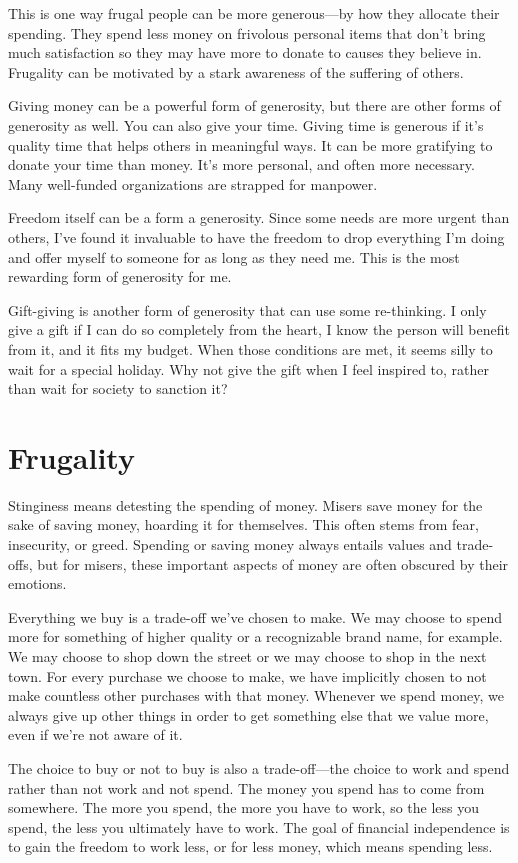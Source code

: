 This is one way frugal people can be more generous---by how they allocate their spending. They spend less money on frivolous personal items that don't bring much satisfaction so they may have more to donate to causes they believe in. Frugality can be motivated by a stark awareness of the suffering of others.

Giving money can be a powerful form of generosity, but there are other forms of generosity as well. You can also give your time. Giving time is generous if it's quality time that helps others in meaningful ways. It can be more gratifying to donate your time than money. It's more personal, and often more necessary. Many well-funded organizations are strapped for manpower. 

Freedom itself can be a form a generosity. Since some needs are more urgent than others, I've found it invaluable to have the freedom to drop everything I'm doing and offer myself to someone for as long as they need me. This is the most rewarding form of generosity for me.

Gift-giving is another form of generosity that can use some re-thinking. I only give a gift if I can do so completely from the heart, I know the person will benefit from it, and it fits my budget. When those conditions are met, it seems silly to wait for a special holiday. Why not give the gift when I feel inspired to, rather than wait for society to sanction it?

\section{Frugality}
Stinginess means detesting the spending of money. Misers save money for the sake of saving money, hoarding it for themselves. This often stems from fear, insecurity, or greed. Spending or saving money always entails values and trade-offs, but for misers, these important aspects of money are often obscured by their emotions.

Everything we buy is a trade-off we've chosen to make. We may choose to spend more for something of higher quality or a recognizable brand name, for example. We may choose to shop down the street or we may choose to shop in the next town. For every purchase we choose to make, we have implicitly chosen to not make countless other purchases with that money. Whenever we spend money, we always give up other things in order to get something else that we value more, even if we're not aware of it.

The choice to buy or not to buy is also a trade-off---the choice to work and spend rather than not work and not spend. The money you spend has to come from somewhere. The more you spend, the more you have to work, so the less you spend, the less you ultimately have to work. The goal of financial independence is to gain the freedom to work less, or for less money, which means spending less.

